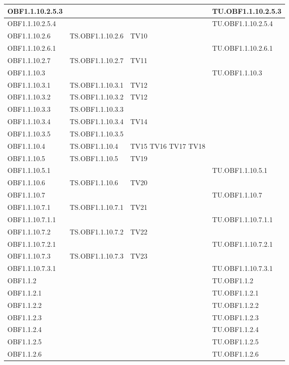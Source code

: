 \documentclass{scalatekids-article}
\begin{document}
\begin{longtable}[H]{|l|p{4cm}|p{4cm}|p{4cm}|}
  \hline
  OBF1.1.10.2.5.3 & & & TU.OBF1.1.10.2.5.3 \\
  \hline
  OBF1.1.10.2.5.4 & & & TU.OBF1.1.10.2.5.4 \\
  \hline
  OBF1.1.10.2.6 & TS.OBF1.1.10.2.6 & TV10 &\\
  \hline
  OBF1.1.10.2.6.1 & & & TU.OBF1.1.10.2.6.1 \\
  \hline
  OBF1.1.10.2.7 & TS.OBF1.1.10.2.7 & TV11 &\\
  \hline
  OBF1.1.10.3 & & & TU.OBF1.1.10.3 \\
  \hline
  OBF1.1.10.3.1 & TS.OBF1.1.10.3.1 & TV12 &\\
  \hline
  OBF1.1.10.3.2 & TS.OBF1.1.10.3.2 & TV12 &\\
  \hline
  OBF1.1.10.3.3 & TS.OBF1.1.10.3.3 &  &\\
  \hline
  OBF1.1.10.3.4 & TS.OBF1.1.10.3.4 & TV14 &\\
  \hline
  OBF1.1.10.3.5 & TS.OBF1.1.10.3.5 &  &\\
  \hline
  OBF1.1.10.4 & TS.OBF1.1.10.4 & TV15 TV16 TV17 TV18 &\\
  \hline
  OBF1.1.10.5 & TS.OBF1.1.10.5 & TV19 &\\
  \hline
  OBF1.1.10.5.1 & & & TU.OBF1.1.10.5.1 \\
  \hline
  OBF1.1.10.6 & TS.OBF1.1.10.6 & TV20 &\\
  \hline
  OBF1.1.10.7 & & & TU.OBF1.1.10.7 \\
  \hline
  OBF1.1.10.7.1 & TS.OBF1.1.10.7.1 & TV21 &\\
  \hline
  OBF1.1.10.7.1.1 & & & TU.OBF1.1.10.7.1.1 \\
  \hline
  OBF1.1.10.7.2 & TS.OBF1.1.10.7.2 & TV22 &\\
  \hline
  OBF1.1.10.7.2.1 & & & TU.OBF1.1.10.7.2.1 \\
  \hline
  OBF1.1.10.7.3 & TS.OBF1.1.10.7.3 & TV23 &\\
  \hline
  OBF1.1.10.7.3.1 & & & TU.OBF1.1.10.7.3.1 \\
  \hline
  OBF1.1.2 & & & TU.OBF1.1.2 \\
  \hline
  OBF1.1.2.1 & & & TU.OBF1.1.2.1 \\
  \hline
  OBF1.1.2.2 &  & & TU.OBF1.1.2.2 \\
  \hline
  OBF1.1.2.3 &  & & TU.OBF1.1.2.3 \\
  \hline
  OBF1.1.2.4 &  & & TU.OBF1.1.2.4 \\
  \hline
  OBF1.1.2.5 &  & & TU.OBF1.1.2.5 \\
  \hline
  OBF1.1.2.6 &  & & TU.OBF1.1.2.6 \\

\end{longtable}
\end{document}
